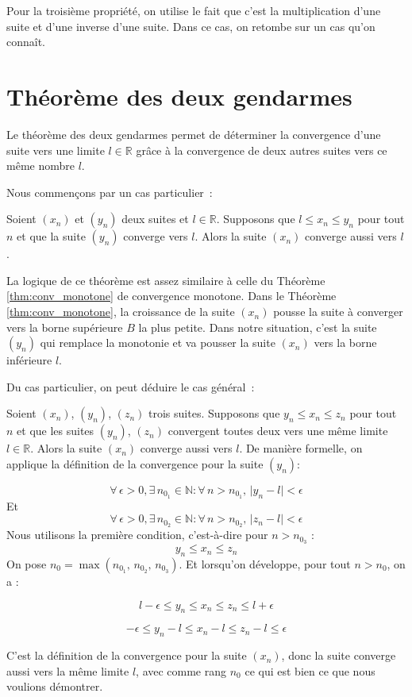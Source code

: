 Pour la troisième propriété, on utilise le fait que c'est la multiplication d'une suite et d'une inverse d'une suite. Dans ce cas, on retombe sur un cas qu'on connaît.


\section{Théorème des deux gendarmes}

Le théorème des deux gendarmes permet de déterminer la convergence d'une suite vers une limite $l \in \mathbb R$ grâce à la convergence de deux autres suites vers ce même nombre $l$.

Nous commençons par un cas particulier~:
\begin{boxthm}
Soient $(x_n)$ et $(y_n)$ deux suites et $l \in \mathbb R$. Supposons que $l \leq x_n \leq y_n$ pour tout $n$ et que la suite $(y_n)$ converge vers $l$. Alors la suite $(x_n)$ converge aussi vers $l$.
\label{thm:deux_gendarmes_part}
\end{boxthm}


La logique de ce théorème est assez similaire à celle du Théorème \ref{thm:conv_monotone} de convergence monotone. Dans le Théorème  \ref{thm:conv_monotone}, la croissance de la suite $(x_n)$ pousse la suite à converger vers la borne supérieure $B$ la plus petite. Dans notre situation, c'est la suite $(y_n)$ qui remplace la monotonie et va pousser la suite $(x_n)$ vers la borne inférieure $l$.


Du cas particulier, on peut déduire le cas général~:
\begin{boxthm}
Soient $(x_n)$, $(y_n)$, $(z_n)$ trois suites. Supposons que $y_n \leq x_n \leq z_n$ pour tout $n$ et que les suites $(y_n)$, $(z_n)$ convergent toutes deux vers une même limite $l \in \mathbb R$. Alors la suite $(x_n)$ converge aussi vers $l$. De manière formelle, on applique la définition de la convergence pour la suite $(y_n)$:

$$\forall \, \epsilon > 0 , \exists \, n_{0_1} \in \mathbb{N} : \forall \, n > n_{0_1}, \, \lvert y_n - l \rvert < \epsilon $$
Et
$$\forall \, \epsilon > 0 , \exists \, n_{0_2} \in \mathbb{N} : \forall \, n > n_{0_2}, \, \lvert z_n - l \rvert < \epsilon $$
Nous utilisons la première condition, c'est-à-dire pour $n > n_{0_3}$ :
$$ y_n \leq x_n \leq z_n$$
On pose $n_0 = \max{(n_{0_1} , \, n_{0_2}, \, n_{0_3})}$. Et lorsqu'on développe, pour tout $n>n_0$, on a :

$$ l-\epsilon \leq y_n \leq x_n \leq z_n \leq l+\epsilon$$

$$-\epsilon \leq y_n - l\leq x_n - l \leq z_n - l\leq \epsilon$$

C'est la définition de la convergence pour la suite $(x_n)$, donc la suite converge aussi vers la même limite $l$, avec comme rang $n_0$ ce qui est bien ce que nous voulions démontrer.
\end{boxthm}


